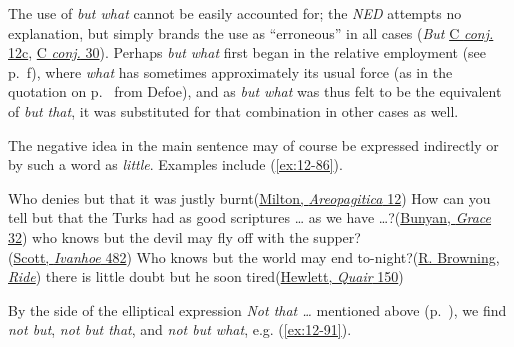 The use of \textit{but what} cannot be easily accounted for; the \textit{NED} attempts no explanation, but simply brands the use as ``erroneous'' in all cases (\textit{But} \href{https://archive.org/details/in.ernet.dli.2015.211152/page/n1239/mode/2up?view=theater}{C \textit{conj.} 12c}, \href{https://archive.org/details/in.ernet.dli.2015.211152/page/n1241/mode/2up?view=theater}{C \textit{conj.} 30}). Perhaps \textit{but what} first began in the relative employment (see p.~\pageref{relative_employment}f), where \textit{what} has sometimes approximately its usual force (as in the quotation on p.~\pageref{defoe_quote} from Defoe), and as \textit{but what} was thus felt to be the equivalent of \textit{but that}, it was substituted for that combination in other cases as well.

The negative idea in the main sentence may of course be expressed indirectly or by such a word as \textit{little}. Examples include (\ref{ex:12-86}).

\ea \label{ex:12-86}
\ea
Who denies but that it was justly burnt\hfill(\href{https://archive.org/details/areopagitica00miltuoft/page/12/mode/2up?q=%22who+denies+but+that%22&view=theater}{Milton, \textit{Areopagitica} 12})
\ex
How can you tell but that the Turks had as good scriptures {\dots} as we have {\dots}?\hfill(\href{https://archive.org/details/graceaboundingto00buny/page/48/mode/2up?q=%22Turks+had+as+good%22&view=theater}{Bunyan, \textit{Grace} 32})
\ex
who knows but the devil may fly off with the supper?\\\hfill(\href{https://archive.org/details/scottsivanhoeedi0000amar/page/592/mode/2up?q=%22devil+may+fly+off%22&view=theater}{Scott, \textit{Ivanhoe} 482})
\ex
Who knows but the world may end to-night?\hfill(\href{https://archive.org/details/cu31924013442631/page/76/mode/2up?q=%22world+may+end%22&view=theater}{R. Browning, \textit{Ride}}) %
\ex
there is little doubt but he soon tired\hfill(\href{https://archive.org/details/queensquairorsi00hewlgoog/page/150/mode/2up?q=%22little+doubt%22&view=theater}{Hewlett, \textit{Quair} 150})
\z
\z

By the side of the elliptical expression \textit{Not that {\dots}} mentioned above (p.~\pageref{not_that}), we find \textit{not but}, \textit{not but that}, and \textit{not but what}, e.g. (\ref{ex:12-91}).

